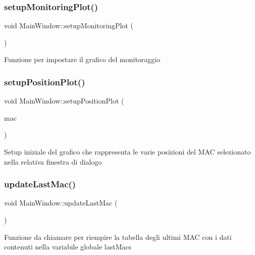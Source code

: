 \subsubsection{\texorpdfstring{setup\+Monitoring\+Plot()}{setupMonitoringPlot()}}
{\footnotesize\ttfamily void Main\+Window\+::setup\+Monitoring\+Plot (\begin{DoxyParamCaption}{ }\end{DoxyParamCaption})}

Funzione per impostare il grafico del monitoraggio \mbox{\label{class_main_window_a14ceceafe4942bdc557a884ef116e7d8}} 
\subsubsection{\texorpdfstring{setup\+Position\+Plot()}{setupPositionPlot()}}
{\footnotesize\ttfamily void Main\+Window\+::setup\+Position\+Plot (\begin{DoxyParamCaption}\item[{Q\+String}]{mac }\end{DoxyParamCaption})}

Setup iniziale del grafico che rappresenta le varie posizioni del M\+AC selezionato nella relativa finestra di dialogo \mbox{\label{class_main_window_a723b5a1e4c2d4e52e053edd0b5123b20}} 
\subsubsection{\texorpdfstring{update\+Last\+Mac()}{updateLastMac()}}
{\footnotesize\ttfamily void Main\+Window\+::update\+Last\+Mac (\begin{DoxyParamCaption}{ }\end{DoxyParamCaption})}

Funzione da chiamare per riempire la tabella degli ultimi M\+AC con i dati contenuti nella variabile globale {\ttfamily last\+Macs} \mbox{\label{class_main_window_a5334b6d12b44c664697a1447fcbcc18b}} 

